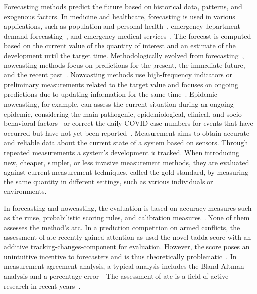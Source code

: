 \documentclass[pdflatex]{sn-jnl}
\theoremstyle{plain}%
\theoremstyle{definition}
\begin{document}
Forecasting methods predict the future based on historical data, patterns, and exogenous factors.
In medicine and healthcare, forecasting is used in various applications, such as population and personal health~\parencite[see, e.g., the review in][]{Soyiri2013}, emergency department demand forecasting~\parencite{Jones2008, Rostami-Tabar2023}, and emergency medical services~\parencite{HaugsboHermansen2021}.
The forecast is computed based on the current value of the quantity of interest and an estimate of the development until the target time.
Methodologically evolved from forecasting~\citep{Browning1989}, nowcasting methods focus on predictions for the present, the immediate future, and the recent past~\citep{Banbura2013, WorldMeteorologicalOrganizationWMO2017}.
Nowcasting methods use high-frequency indicators or preliminary measurements related to the target value and focuses on ongoing predictions due to updating information for the same time~\citep{Castle2017}.
Epidemic nowcasting, for example, can assess the current situation during an ongoing epidemic, considering the main pathogenic, epidemiological, clinical, and socio-behavioral factors~\citep{Wu2021} or correct the daily COVID case numbers for events that have occurred but have not yet been reported~\citep{Gunther2021, Wolffram2023}.
Measurement aims to obtain accurate and reliable data about the current state of a system based on sensors.
Through repeated measurements a system's development is tracked.
When introducing new, cheaper, simpler, or less invasive measurement methods, they are evaluated against current measurement techniques, called the gold standard, by measuring the same quantity in different settings, such as various individuals or environments.

In forecasting and nowcasting, the evaluation is based on accuracy measures such as the \ac{rmse}, probabilistic scoring rules, and calibration measures~\citep{Gneiting2007, Gunther2021, Wolffram2023}.
None of them assesses the method's \ac{atc}.
In a prediction competition on armed conflicts, the assessment of \ac{atc} recently gained attention as \citet{Vesco2022} used the novel \ac{tadda} score with an additive tracking-changes-component for evaluation.
However, the score poses an unintuitive incentive to forecasters and is thus theoretically problematic~\parencite{Bracher2023}.
In measurement agreement analysis, a typical analysis includes the Bland-Altman analysis and a percentage error~\citep{Bland1986}.
The assessment of \ac{atc} is a field of active research in recent years~\citep{Saugel2015, Saugel2018, Hiraishi2021}.
\end{document}
